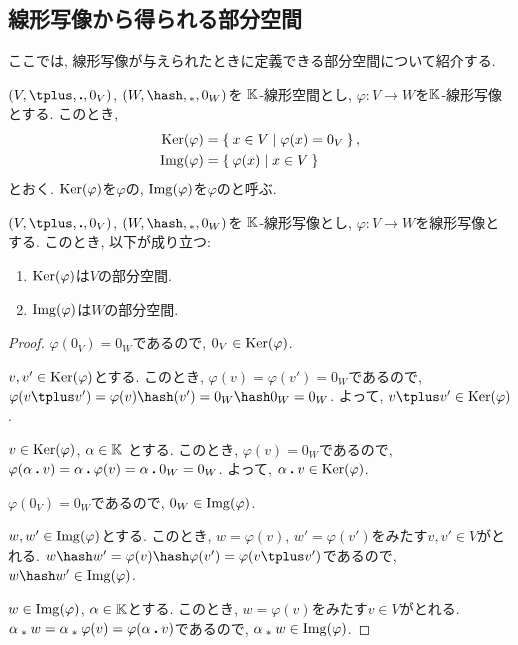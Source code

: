 \subsection{線形写像から得られる部分空間}
\label{sec:subspace:mor}
ここでは,
線形写像が与えられたときに定義できる部分空間について紹介する.
\begin{definition}
  $(V,\plus,\act,0_V)$,
  $(W,\pplus,\aact,0_W)$を
  $\mathbb{K}$-線形空間とし,
  $\varphi\colon V\to W$を$\mathbb{K}$-線形写像とする.
  このとき,
  \begin{align*}
    \operatorname{Ker}(\varphi)&=\Set{x\in V|\varphi(x)=0_V  },\\
    \operatorname{Img}(\varphi)&=\Set{\varphi(x)|x\in V}
  \end{align*}
  とおく. $\operatorname{Ker}(\varphi)$を$\varphi$の,
  $\operatorname{Img}(\varphi)$を$\varphi$のと呼ぶ.
\end{definition}
\begin{prop}
  $(V,\plus,\act,0_V)$,
  $(W,\pplus,\aact,0_W)$を
  $\mathbb{K}$-線形写像とし,
  $\varphi\colon V\to W$を線形写像とする.
このとき, 以下が成り立つ:
\begin{enumerate}
  \item $\operatorname{Ker}(\varphi)$は$V$の部分空間.
  \item $\operatorname{Img}(\varphi)$は$W$の部分空間.
\end{enumerate}
\end{prop}
\begin{proof}
$\varphi(0_V)=0_W$であるので,
$0_V\in\operatorname{Ker}(\varphi)$.

$v,v'\in \operatorname{Ker}(\varphi)$とする.
このとき,
$\varphi(v)=\varphi(v')=0_W$であるので,
$\varphi(v\plus v')=\varphi(v)\pplus (v')=0_W\pplus 0_W=0_W$.
よって, $v\plus v'\in\Ker(\varphi)$.

$v\in \operatorname{Ker}(\varphi)$,
$\alpha\in \mathbb{K}$
とする.
このとき,
$\varphi(v)=0_W$であるので,
$\varphi(\alpha\mathbin{\boldsymbol{.}} v)=\alpha\mathbin{\boldsymbol{.}} \varphi(v)=\alpha\mathbin{\boldsymbol{.}} 0_W=0_W$.
よって, $\alpha\mathbin{\boldsymbol{.}} v\in\operatorname{Ker}(\varphi)$.


$\varphi(0_V)=0_W$であるので,
$0_W\in\operatorname{Img}(\varphi)$.

$w,w'\in \operatorname{Img}(\varphi)$とする.
このとき,
$w=\varphi(v)$, $w'=\varphi(v')$をみたす$v, v'\in V$がとれる.
$w\pplus w'=\varphi(v)\pplus\varphi(v')=\varphi(v\plus v')$であるので,
$w\pplus w'\in\Img(\varphi)$.

$w\in \operatorname{Img}(\varphi)$,
$\alpha\in\mathbb{K}$とする.
このとき,
$w=\varphi(v)$をみたす$v\in V$がとれる.
$\alpha\mathbin{{}_\ast} w=\alpha\mathbin{{}_\ast}\varphi(v)=\varphi(\alpha\mathbin{\boldsymbol{.}} v)$であるので,
$\alpha\mathbin{{}_\ast} w\in\operatorname{Img}(\varphi)$.
\end{proof}


